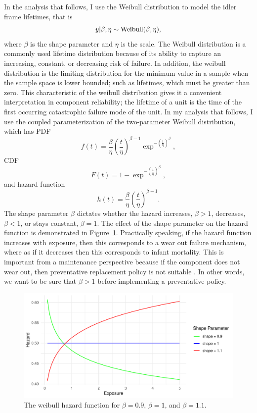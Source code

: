 In the analysis that follows, I use the Weibull distribution to model the idler frame lifetimes, that is
\begin{equation}
    y|\beta, \eta \sim \hbox{Weibull}(\beta, \eta),
\end{equation}
where $\beta$ is the shape parameter and $\eta$ is the scale. The Weibull distribution is a commonly used lifetime distribution because of its ability to capture an increasing, constant, or decreasing risk of failure. In addition, the weibull distribution is the limiting distribution for the minimum value in a sample when the sample space is lower bounded; such as lifetimes, which must be greater than zero. This characteristic of the weibull distribution gives it a convenient interpretation in component reliability; the lifetime of a unit is the time of the first occurring catastrophic failure mode of the unit. In my analysis that follows, I use the coupled parameterization of the two-parameter Weibull distribution, which has PDF
\begin{equation}
    f(t) = \frac{\beta}{\eta}\left(\frac{t}{\eta}\right)^{\beta - 1} \exp^{-\left(\frac{t}{\eta}\right)^{\beta}},
\end{equation}
CDF
\begin{equation}
    F(t) = 1 - \exp^{-\left(\frac{t}{\eta}\right)^{\beta}},
\end{equation}
and hazard function
\begin{equation}
    h(t) = \frac{\beta}{\eta}\left(\frac{t}{\eta}\right)^{\beta - 1}.
\end{equation}
The shape parameter $\beta$ dictates whether the hazard increases, $\beta > 1$, decreases, $\beta < 1$, or stays constant, $\beta = 1$. The effect of the shape parameter on the hazard function is demonstrated in Figure~\ref{fig:hazard_function_demo}. Practically speaking, if the hazard function increases with exposure, then this corresponds to a wear out failure mechanism, where as if it decreases then this corresponds to infant mortality. This is important from a maintenance perspective because if the component does not wear out, then preventative replacement policy is not suitable \citep{jardine2013}. In other words, we want to be sure that $\beta > 1$ before implementing a preventative policy.

\begin{figure}[h]
    \centering
    \includegraphics[width=1\textwidth]{./figures/hazard_func_demo.pdf}
    \caption{The weibull hazard function for $\beta = 0.9$, $\beta = 1$, and $\beta = 1.1$.}
    \label{fig:hazard_function_demo}
\end{figure}

